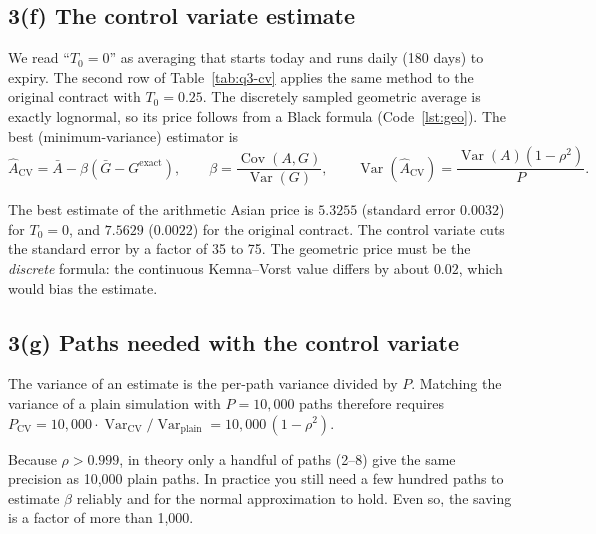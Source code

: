 \documentclass[11pt,a4paper]{article}
\newcommand{\restab}[3]{%
  \begin{table}[H]\centering\footnotesize
  \caption{#2}\label{#3}
  
  \end{table}}
\begin{document}
\subsection*{3(f) The control variate estimate}
We read ``$T_0=0$'' as averaging that starts today and runs daily (180 days)
to expiry. The second row of Table~\ref{tab:q3-cv} applies the same method
to the original contract with $T_0=0.25$. The discretely sampled geometric
average is exactly lognormal, so its price follows from a Black formula
(Code~\ref{lst:geo}). The best (minimum-variance) estimator is
\begin{equation*}
\hat A_{\text{CV}}=\bar A-\beta\left(\bar G-G^{\text{exact}}\right),\qquad
\beta=\frac{\operatorname{Cov}(A,G)}{\operatorname{Var}(G)},\qquad
\operatorname{Var}(\hat A_{\text{CV}})=\frac{\operatorname{Var}(A)
(1-\rho^2)}{P}.
\end{equation*}
\restab{q3_cv}{Control variate results ($P=5{,}000$). K--V is the
continuous-averaging Kemna--Vorst formula from the lecture.}{tab:q3-cv}
The best estimate of the arithmetic Asian price is $\mathbf{5.3255}$
(standard error $0.0032$) for $T_0=0$, and $7.5629$ ($0.0022$) for the
original contract. The control variate cuts the standard error by a factor
of 35 to 75. The geometric price must be the \emph{discrete} formula: the
continuous Kemna--Vorst value differs by about $0.02$, which would bias the
estimate.


\subsection*{3(g) Paths needed with the control variate}
The variance of an estimate is the per-path variance divided by $P$.
Matching the variance of a plain simulation with $P=10{,}000$ paths
therefore requires
$P_{\text{CV}}=10{,}000\cdot\operatorname{Var}_{\text{CV}}/
\operatorname{Var}_{\text{plain}}=10{,}000\,(1-\rho^2)$.
\restab{q3_paths}{Per-path variances and the equivalent number of paths
(estimated with 10,000 paths).}{tab:q3-paths}
Because $\rho>0.999$, in theory only a handful of paths (2--8) give the same
precision as 10,000 plain paths. In practice you still need a few hundred
paths to estimate $\beta$ reliably and for the normal approximation to hold.
Even so, the saving is a factor of more than 1,000.

\end{document}

